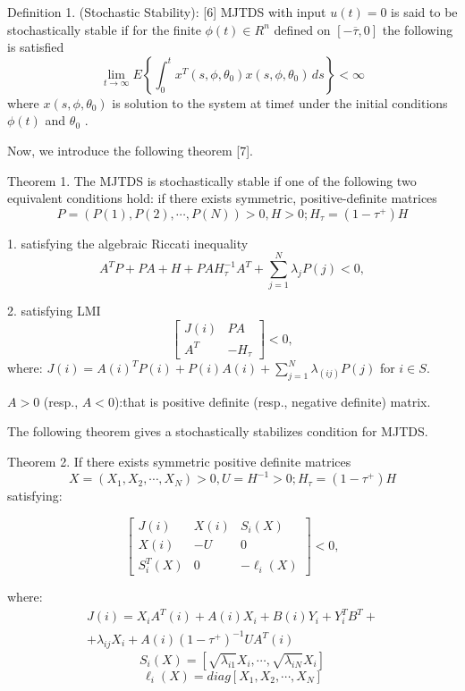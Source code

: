 Definition 1. (Stochastic Stability): [6] MJTDS with input $u(t)=0$ is said to be stochastically stable if for the finite $\phi(t)\in R^n$ defined on $[-\overline \tau,0]$ the following is satisfied
\begin{equation}
\lim_{t\to\infty} E\left\{\int_{0}^{t} x^T(s,\phi,\theta_0)x(s,\phi,\theta_0) \,ds\right\}<\infty
\end{equation}
where $x(s,\phi,\theta_0)$ is solution to the system at time$t$ under the initial conditions $\phi(t)$ and $\theta_0 $ .

Now, we introduce the following theorem [7].

Theorem 1. The MJTDS is stochastically stable if one of the following two equivalent conditions hold:
if there exists symmetric, positive-definite matrices
\begin{equation}
P=(P(1),P(2),\cdots,P(N))>0 ,H>0; H_\tau =(1-\tau^+)H
\end{equation}

1. satisfying the algebraic Riccati inequality
\begin{equation}
A^TP+PA+H+PAH_\tau^{-1} A^T +\sum_{j=1}^{N}\lambda_jP(j)<0,
\end{equation}

2. satisfying LMI
\begin{equation}
\begin{bmatrix}
J(i) & PA\\
A^T & -H_\tau
\end{bmatrix} <0,
\end{equation}
where:
 $J(i)=A(i)^TP(i)+P(i)A(i)+\sum_{j=1}^{N}\lambda_(ij)P(j)$ for $i \in S$.

$A>0$ (resp., $A<0$):that is positive definite (resp., negative definite) matrix.

The following theorem gives a stochastically stabilizes condition for MJTDS.

Theorem 2. If there exists symmetric positive definite matrices
$$X=(X_1,X_2,\cdots,X_N)>0 ,U=H^{-1}>0; H_\tau =(1-\tau^+)H$$ satisfying:

\begin{equation}
\begin{bmatrix}
J(i) & X(i) & S_i(X)\\
X(i) & -U & 0 \\
S_i^T(X) & 0 & -\ell_i(X)
\end{bmatrix} <0,
\end{equation}

where:
\begin{multline*}
	J(i)=X_iA^T(i)+A(i)X_i+B(i)Y_i+Y_i^TB^T+
	\\+
	\lambda_{ij}X_i+A(i)(1-\tau^+)^{-1}UA^T(i)
\end{multline*}
$$S_i(X)=[\sqrt{\lambda_{i1}}X_i,\cdots,\sqrt{\lambda_{iN}}X_i]$$
$$\ell_i(X)=diag[X_1,X_2,\cdots,X_N]$$

